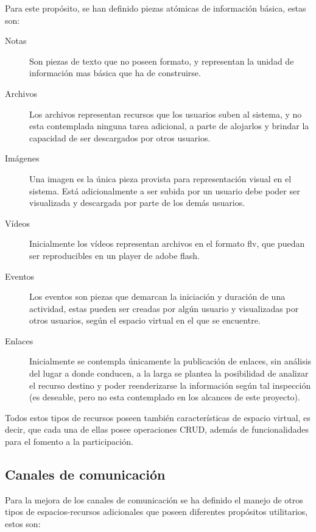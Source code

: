 Para este propósito, se han definido piezas atómicas de información básica,
estas son:

\begin{description}
\item [Notas] Son piezas de texto que no poseen formato, y representan la unidad
de información mas básica que ha de construirse.
\item [Archivos] Los archivos representan recursos que los usuarios suben al
sistema, y no esta contemplada ninguna tarea adicional, a parte de alojarlos y
brindar la capacidad de ser descargados por otros usuarios.
\item [Imágenes] Una imagen es la única pieza provista para representación
visual en el sistema. Está adicionalmente a ser subida por un usuario debe
poder ser visualizada y descargada por parte de los demás usuarios.
\item [Vídeos] Inicialmente los vídeos representan archivos en el formato flv,
que puedan ser reproducibles en un player de adobe flash.
\item [Eventos] Los eventos son piezas que demarcan la iniciación y duración de
una actividad, estas pueden ser creadas por algún usuario y visualizadas por
otros usuarios, según el espacio virtual en el que se encuentre.
\item [Enlaces] Inicialmente se contempla únicamente la publicación de enlaces,
sin análisis del lugar a donde conducen, a la larga se plantea la posibilidad de
analizar el recurso destino y poder reenderizarse la información según tal
inspección (es deseable, pero no esta contemplado en los alcances de este
proyecto).
\end{description}

Todos estos tipos de recursos poseen también características de espacio virtual,
es decir, que cada una de ellas posee operaciones CRUD, además de
funcionalidades para el fomento a la participación.

\subsection{Canales de comunicación}

Para la mejora de los canales de comunicación se ha definido el manejo de otros
tipos de espacios-recursos adicionales que poseen diferentes propósitos
utilitarios, estos son:

